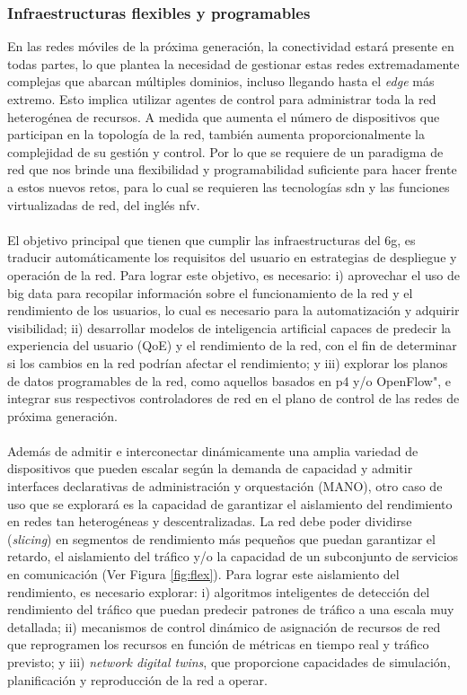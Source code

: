 \subsubsection{Infraestructuras flexibles y programables }

En las redes móviles de la próxima generación, la conectividad estará presente en todas partes, lo que plantea la necesidad de gestionar estas redes extremadamente complejas que abarcan múltiples dominios, incluso llegando hasta el \textit{edge} más extremo. Esto implica utilizar agentes de control para administrar toda la red heterogénea de recursos. A medida que aumenta el número de dispositivos que participan en la topología de la red, también aumenta proporcionalmente la complejidad de su gestión y control. Por lo que se requiere de un paradigma de red que nos brinde una flexibilidad y programabilidad suficiente para hacer frente a estos nuevos retos, para lo cual se requieren las tecnologías \gls{sdn} y las funciones virtualizadas de red, del inglés \gls{nfv}. \\
\\
El objetivo principal que tienen que cumplir las infraestructuras del \gls{6g}, es traducir automáticamente los requisitos del usuario en estrategias de despliegue y operación de la red. Para lograr este objetivo, es necesario: i) aprovechar el uso de big data para recopilar información sobre el funcionamiento de la red y el rendimiento de los usuarios, lo cual es necesario para la automatización y adquirir visibilidad; ii) desarrollar modelos de inteligencia artificial capaces de predecir la experiencia del usuario (QoE) y el rendimiento de la red, con el fin de determinar si los cambios en la red podrían afectar el rendimiento; y iii) explorar los planos de datos programables de la red, como aquellos basados en \gls{p4} y/o OpenFlow", e integrar sus respectivos controladores de red en el plano de control de las redes de próxima generación.\\
\\
Además de admitir e interconectar dinámicamente una amplia variedad de dispositivos que pueden escalar según la demanda de capacidad y admitir interfaces declarativas de administración y orquestación (MANO), otro caso de uso que se explorará es la capacidad de garantizar el aislamiento del rendimiento en redes tan heterogéneas y descentralizadas. La red debe poder dividirse (\textit{slicing})  en segmentos de rendimiento más pequeños que puedan garantizar el retardo, el aislamiento del tráfico y/o la capacidad de un subconjunto de servicios en comunicación (Ver Figura \ref{fig:flex}). Para lograr este aislamiento del rendimiento, es necesario explorar: i) algoritmos inteligentes de detección del rendimiento del tráfico que puedan predecir patrones de tráfico a una escala muy detallada; ii) mecanismos de control dinámico de asignación de recursos de red que reprogramen los recursos en función de métricas en tiempo real y tráfico previsto; y iii) \textit{network digital twins}, que proporcione capacidades de simulación, planificación y reproducción de la red a operar.\\

